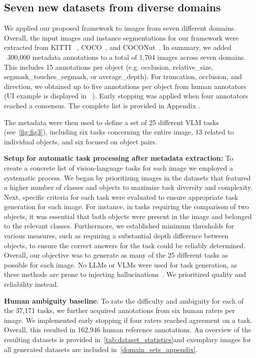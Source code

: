 \subsection{Seven new datasets from diverse domains}
We applied our proposed framework to images from seven different domains. Overall, the input images and instance segmentations for our framework were extracted from KITTI ~\cite{geiger2012kitti}, COCO~\cite{lin2014microsoft}, and COCONut~\cite{deng2024coconut}. In summary, we added ~300,000 metadata annotations to a total of 1,704 images across seven domains. This includes 15 annotations per object (e.g. occlusion, relative\_size, segmask\_touches\_segmask, or average\_depth). For truncation, occlusion, and direction, we obtained up to five annotations per object from human annotators (UI example is displayed in ~). Early stopping was applied when four annotators reached a consensus. The complete list is provided in Appendix .

The metadata were then used to define a set of 25 different VLM tasks (see~\cref{fig:fig3}), including six tasks concerning the entire image, 13 related to individual objects, and six focused on object pairs.



\textbf{Setup for automatic task processing after metadata extraction:}
To create a concrete list of vision-language tasks for each image we employed a systematic process. We began by prioritizing images in the datasets that featured a higher number of classes and objects to maximize task diversity and complexity. Next, specific criteria for each task were evaluated to ensure appropriate task generation for each image. For instance, in tasks requiring the comparison of two objects, it was essential that both objects were present in the image and belonged to the relevant classes. Furthermore, we established minimum thresholds for various measures, such as requiring a substantial depth difference between objects, to ensure the correct answers for the task could be reliably determined. Overall, our objective was to generate as many of the 25 different tasks as possible for each image. No LLMs or VLMs were used for task generation, as these methods are prone to injecting hallucinations~\cite{wang2023instruct4v,wang2024journeybench}. We prioritized quality and reliability instead.

\textbf{Human ambiguity baseline}: To rate the difficulty and ambiguity for each of the 37,171 tasks, we further acquired annotations from six human raters per image. We implemented early stopping if four raters reached agreement on a task. Overall, this resulted in 162,946 human reference annotations. An overview of the resulting datasets is provided in~\cref{tab:dataset_statistics}and exemplary images for all generated datasets are included in~\cref{domain_sets_appendix}.




